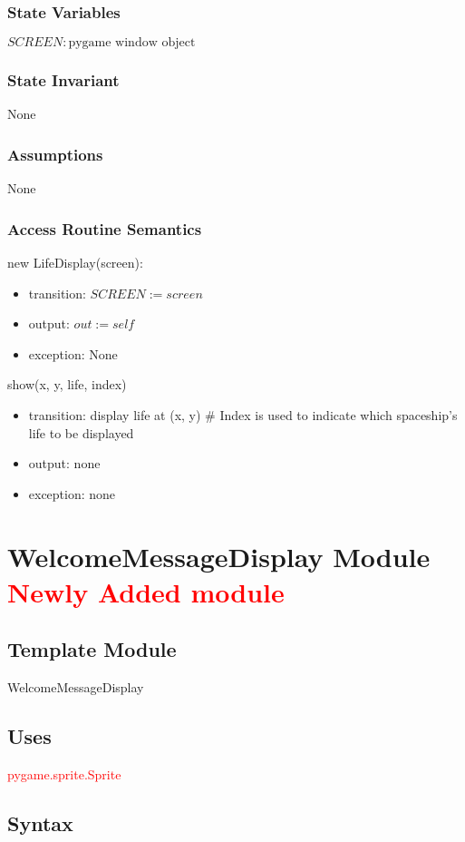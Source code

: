 \documentclass[12pt]{article}
\begin{document}
\subsubsection*{State Variables}
$SCREEN : \text{pygame window object}$
\subsubsection*{State Invariant}
None
\subsubsection*{Assumptions}
None
\subsubsection*{Access Routine Semantics}
\noindent new LifeDisplay(screen):
\begin{itemize}
\item transition: $SCREEN := screen$
\item output: $out := \mathit{self}$
\item exception: None
\end{itemize}

\noindent show(x, y, life, index)
\begin{itemize}
\item transition: display life at (x, y) \# Index is used to indicate which 
spaceship's life to be displayed
\item output: none
\item exception: none
\end{itemize}
\newpage


\section{WelcomeMessageDisplay Module \textcolor{red}{Newly Added module}}

\subsection*{Template Module}
WelcomeMessageDisplay
\subsection*{Uses}
\textcolor{red}{pygame.sprite.Sprite}

\subsection*{Syntax}
\end{document}
